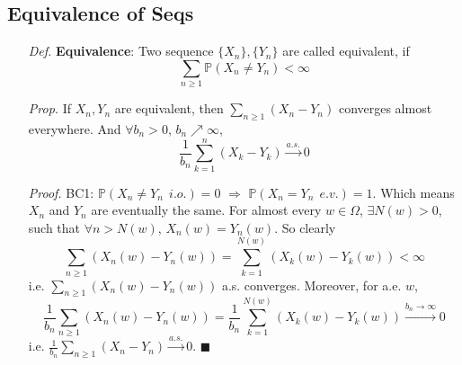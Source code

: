 \documentclass[a4paper,12pt,twoside]{book}
\begin{document}
\subsection{Equivalence of Seqs}
\begin{itemize}
	\item[\textit{Def.}] \textbf{Equivalence}: Two sequence $\{X_n\}, \{Y_n\}$ are called equivalent, if
	\begin{equation}
		\sum_{n\geq 1}\mathbb{P}\left(X_n\ne Y_n\right)<\infty
	\end{equation}

	\item[\textit{Prop.}] If $X_n, Y_n$ are equivalent, then $\sum_{n\geq 1}(X_n-Y_n)$ converges almost everywhere. And $\forall b_n >0$, $b_n \nearrow \infty$,
	\begin{equation}
		\frac{1}{b_n}\sum_{k=1}^n(X_k - Y_k) \xrightarrow{a.s.} 0
	\end{equation}

	\item[\textit{Proof.}] BC1: $\mathbb{P}\left(X_n\ne Y_n~~i.o.\right)=0$ $\Rightarrow$ $\mathbb{P}\left(X_n=Y_n~~e.v.\right)=1$. Which means $X_n$ and $Y_n$ are eventually the same.\newline
	For almost every $w\in \Omega$, $\exists N(w)>0$, such that $\forall n>N(w)$, $X_n(w)=Y_n(w)$. So clearly
	\begin{equation}
		\sum_{n\geq 1}(X_n(w)-Y_n(w))=\sum_{k=1}^{N(w)}(X_k(w)-Y_k(w))<\infty
	\end{equation}
	i.e. $\sum_{n\geq 1}(X_n(w)-Y_n(w))$ a.s. converges. \newline
	Moreover, for a.e. $w$,
	\begin{equation}
		\frac{1}{b_n}\sum_{n\geq 1}(X_n(w)-Y_n(w))=\frac{1}{b_n}\sum_{k=1}^{N(w)}(X_k(w)-Y_k(w)) \xrightarrow{b_n\to \infty}0
	\end{equation}
	i.e. $\frac{1}{b_n}\sum_{n\geq 1}(X_n-Y_n)\xrightarrow{a.s.}0$. $\blacksquare$

\end{itemize}

\end{document}
